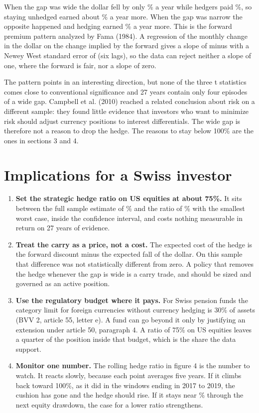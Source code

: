 \documentclass[a4paper,fontsize=10.2pt,parskip=half-]{scrartcl}
\newcommand{\lead}[1]{\textbf{#1}}
\begin{document}
When the gap was wide the dollar fell by only \TerHighSpotAbs\% a year while hedgers paid \TerHighCarryAbs\%, so staying unhedged earned about \TerHighX\% a year more. When the gap was narrow the opposite happened and hedging earned \TerLowXAbs\% a year more. This is the forward premium pattern analyzed by Fama (1984). A regression of the monthly change in the dollar on the change implied by the forward gives a slope of minus \FamaBetaAbs{} with a Newey West standard error of \FamaSE{} (six lags), so the data can reject neither a slope of one, where the forward is fair, nor a slope of zero.

The pattern points in an interesting direction, but none of the three t statistics comes close to conventional significance and 27 years contain only four episodes of a wide gap. Campbell et al. (2010) reached a related conclusion about risk on a different sample: they found little evidence that investors who want to minimize risk should adjust currency positions to interest differentials. The wide gap is therefore not a reason to drop the hedge. The reasons to stay below 100\% are the ones in sections 3 and 4.

\section{Implications for a Swiss investor}

\begin{enumerate}[label=\textbf{\arabic*.}]
\item \lead{Set the strategic hedge ratio on US equities at about 75\%.} It sits between the full sample estimate of \HStar\% and the ratio of \MinimaxH\% with the smallest worst case, inside the confidence interval, and costs nothing measurable in return on 27 years of evidence.
\item \lead{Treat the carry as a price, not a cost.} The expected cost of the hedge is the forward discount minus the expected fall of the dollar. On this sample that difference was not statistically different from zero. A policy that removes the hedge whenever the gap is wide is a carry trade, and should be sized and governed as an active position.
\item \lead{Use the regulatory budget where it pays.} For Swiss pension funds the category limit for foreign currencies without currency hedging is 30\% of assets (BVV 2, article 55, letter e). A fund can go beyond it only by justifying an extension under article 50, paragraph 4. A ratio of 75\% on US equities leaves a quarter of the position inside that budget, which is the share the data support.
\item \lead{Monitor one number.} The rolling hedge ratio in figure 4 is the number to watch. It reacts slowly, because each point averages five years. If it climbs back toward 100\%, as it did in the windows ending in 2017 to 2019, the cushion has gone and the hedge should rise. If it stays near \RollHLast\% through the next equity drawdown, the case for a lower ratio strengthens.
\end{enumerate}
\end{document}
